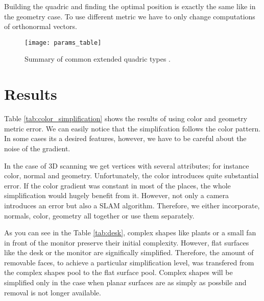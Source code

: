Building the quadric and finding the optimal position is exactly the same like in the geometry case. To use different metric we have to only change computations of orthonormal vectors.

\begin{figure}[H]
  \begin{center}
    \texttt{[image: params\_table]}
    \caption{Summary of common extended quadric types \cite{garland99}.}
    \label{fig:params_table}
  \end{center}
\end{figure}

\section{Results}

Table \ref{tab:color_simplification} shows the results of using color and geometry metric error. We can easily notice that the simplifcation follows the color pattern. In some cases its a desired features, however, we have to be careful about the noise of the gradient.

In the case of 3D scanning we get vertices with several attributes; for instance color, normal and geometry. Unfortunately, the color introduces quite substantial error. If the color gradient was constant in most of the places, the whole simplification would hugely benefit from it. However, not only a camera introduces an error but also a SLAM algorithm. Therefore, we either incorporate, normals, color, geometry all together or use them separately.

As you can see in the Table \ref{tab:desk}, complex shapes like plants or a small fan in front of the monitor preserve their initial complexity. However, flat surfaces like the desk or the monitor are significally simplified. Therefore, the amount of removable faces, to achieve a particular simplification level, was transfered from the complex shapes pool to the flat surface pool. Complex shapes will be simplified only in the case when planar surfaces are as simply as possbile and removal is not longer available.

